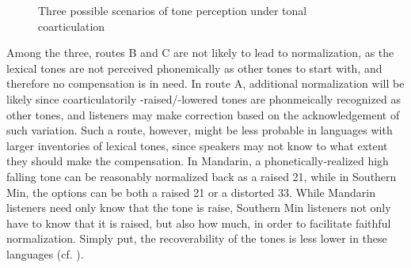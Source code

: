 \documentclass[12pt]{report}
\begin{document}
\begin{CJK}{UTF8}{bsmi}
\begin{figure}[hbt!]
\caption{Three possible scenarios of tone perception under tonal coarticulation}
\label{Figure:ThreePossibleScenarios}
\end{figure}
Among the three, routes B and C are not likely to lead to normalization, as the lexical tones are not perceived phonemically as other tones to start with, and therefore no compensation is in need. In route A, additional normalization will be likely since coarticulatorily -raised/-lowered tones are phonmeically recognized as other tones, and listeners may make correction based on the acknowledgement of such variation. Such a route, however, might be less probable in languages with larger inventories of lexical tones, since speakers may not know to what extent they should make the compensation. In Mandarin, a phonetically-realized high falling tone can be reasonably normalized back as a raised 21, while in Southern Min, the options can be both a raised 21 or a distorted 33. While Mandarin listeners need only know that the tone is raise, Southern Min listeners not only have to know that it is raised, but also how much, in order to facilitate faithful normalization. Simply put, the recoverability of the tones is less lower in these languages (cf. \citealp{Flemming2011}).


\end{CJK}
\end{document}
